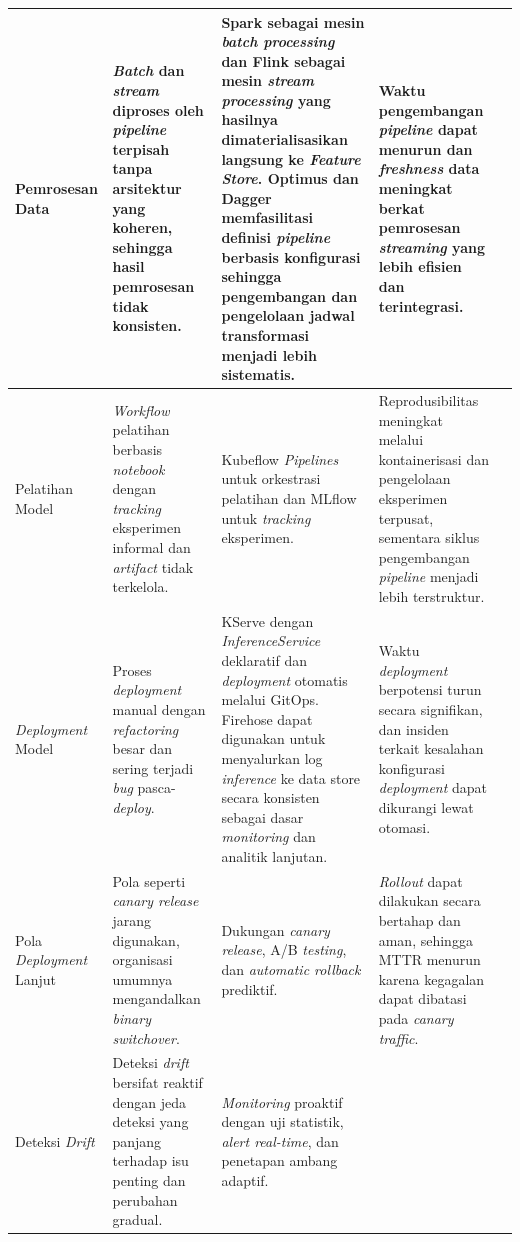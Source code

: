 {\begin{longtable}{|m{2cm}|m{2.5cm}|m{2.5cm}|m{3cm}|m{2cm}|}
\hline
Pemrosesan Data &
\textit{Batch} dan \textit{stream} diproses oleh \textit{pipeline} terpisah tanpa arsitektur yang koheren, sehingga hasil pemrosesan tidak konsisten. &
Spark sebagai mesin \textit{batch processing} dan Flink sebagai mesin \textit{stream processing} yang hasilnya dimaterialisasikan langsung ke \textit{Feature Store}. Optimus dan Dagger memfasilitasi definisi \textit{pipeline} berbasis konfigurasi sehingga pengembangan dan pengelolaan jadwal transformasi menjadi lebih sistematis. &
Waktu pengembangan \textit{pipeline} dapat menurun dan \textit{freshness} data meningkat berkat pemrosesan \textit{streaming} yang lebih efisien dan terintegrasi. &
\autocite{rodrigues2025architecture} \\
\hline
Pelatihan Model &
\textit{Workflow} pelatihan berbasis \textit{notebook} dengan \textit{tracking} eksperimen informal dan \textit{artifact} tidak terkelola. &
Kubeflow \textit{Pipelines} untuk orkestrasi pelatihan dan MLflow untuk \textit{tracking} eksperimen. &
Reprodusibilitas meningkat melalui kontainerisasi dan pengelolaan eksperimen terpusat, sementara siklus pengembangan \textit{pipeline} menjadi lebih terstruktur. &
\autocite{amershi2019software,pimentel2019notebooks} \\
\hline
\textit{Deployment} Model &
Proses \textit{deployment} manual dengan \textit{refactoring} besar dan sering terjadi \textit{bug} pasca-\textit{deploy}. &
KServe dengan \textit{InferenceService} deklaratif dan \textit{deployment} otomatis melalui GitOps. Firehose dapat digunakan untuk menyalurkan log \textit{inference} ke data store secara konsisten sebagai dasar \textit{monitoring} dan analitik lanjutan. &
Waktu \textit{deployment} berpotensi turun secara signifikan, dan insiden terkait kesalahan konfigurasi \textit{deployment} dapat dikurangi lewat otomasi. &
\autocite{paleyes2022challenges} \\
\hline
Pola \textit{Deployment} Lanjut &
Pola seperti \textit{canary release} jarang digunakan, organisasi umumnya mengandalkan \textit{binary switchover}. &
Dukungan \textit{canary release}, A/B \textit{testing}, dan \textit{automatic rollback} prediktif. &
\textit{Rollout} dapat dilakukan secara bertahap dan aman, sehingga MTTR menurun karena kegagalan dapat dibatasi pada \textit{canary traffic}. &
\autocite{shankar2022operationalizing} \\
\hline
Deteksi \textit{Drift} &
Deteksi \textit{drift} bersifat reaktif dengan jeda deteksi yang panjang terhadap isu penting dan perubahan gradual. &
\textit{Monitoring} proaktif dengan uji statistik, \textit{alert real-time}, dan penetapan ambang adaptif. &

\end{longtable}}

